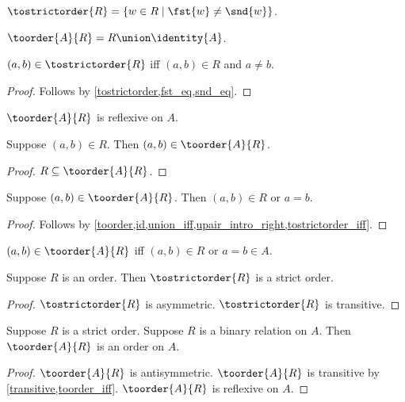 \begin{definition}\label{tostrictorder}
    $\tostrictorder{R} = \{w\in R\mid \fst{w}\neq\snd{w}\}$.
\end{definition}

\begin{definition}\label{toorder}
    $\toorder{A}{R} = R\union\identity{A}$.
\end{definition}

\begin{proposition}\label{tostrictorder_iff}
    $(a,b)\in\tostrictorder{R}$ iff $(a,b)\in R$ and $a\neq b$.
\end{proposition}
\begin{proof}
    Follows by \cref{tostrictorder,fst_eq,snd_eq}.
\end{proof}

\begin{proposition}\label{toorder_reflexive}
    $\toorder{A}{R}$ is reflexive on $A$.
\end{proposition}

\begin{proposition}\label{toorder_intro}
    Suppose $(a,b)\in R$.
    Then $(a,b)\in\toorder{A}{R}$.
\end{proposition}
\begin{proof}
    $R\subseteq\toorder{A}{R}$.
\end{proof}

\begin{proposition}\label{toorder_elim}
    Suppose $(a,b)\in\toorder{A}{R}$.
    Then $(a,b)\in R$ or $a = b$.
\end{proposition}
\begin{proof}
    Follows by \cref{toorder,id,union_iff,upair_intro_right,tostrictorder_iff}.
\end{proof}

\begin{proposition}\label{toorder_iff}
    $(a,b)\in\toorder{A}{R}$ iff $(a,b)\in R$ or $a = b\in A$.
\end{proposition}

\begin{proposition}\label{strictorder_from_order}
    Suppose $R$ is an order.
    Then $\tostrictorder{R}$ is a strict order.
\end{proposition}
\begin{proof}
    $\tostrictorder{R}$ is asymmetric.
    $\tostrictorder{R}$ is transitive.
\end{proof}

\begin{proposition}\label{order_from_strictorder}
    Suppose $R$ is a strict order.
    Suppose $R$ is a binary relation on $A$.
    Then $\toorder{A}{R}$ is an order on $A$.
\end{proposition}
\begin{proof}
    $\toorder{A}{R}$ is antisymmetric.
    $\toorder{A}{R}$ is transitive by \cref{transitive,toorder_iff}.
    $\toorder{A}{R}$ is reflexive on $A$.
\end{proof}

